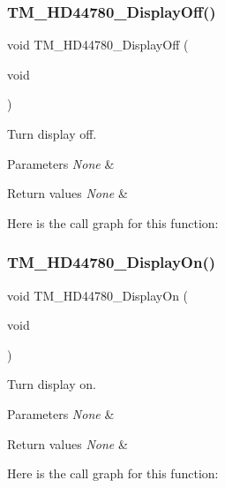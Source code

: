 \subsubsection{\texorpdfstring{T\+M\+\_\+\+H\+D44780\+\_\+\+Display\+Off()}{TM\_HD44780\_DisplayOff()}}
{\footnotesize\ttfamily void T\+M\+\_\+\+H\+D44780\+\_\+\+Display\+Off (\begin{DoxyParamCaption}\item[{void}]{ }\end{DoxyParamCaption})}



Turn display off. 


\begin{DoxyParams}{Parameters}
{\em None} & \\
\hline
\end{DoxyParams}

\begin{DoxyRetVals}{Return values}
{\em None} & \\
\hline
\end{DoxyRetVals}
Here is the call graph for this function\+:
\mbox{\label{group___t_m___h_d44780___functions_ga2f61b153a32e30c63a67888cf8e0ee86}} 
\subsubsection{\texorpdfstring{T\+M\+\_\+\+H\+D44780\+\_\+\+Display\+On()}{TM\_HD44780\_DisplayOn()}}
{\footnotesize\ttfamily void T\+M\+\_\+\+H\+D44780\+\_\+\+Display\+On (\begin{DoxyParamCaption}\item[{void}]{ }\end{DoxyParamCaption})}



Turn display on. 


\begin{DoxyParams}{Parameters}
{\em None} & \\
\hline
\end{DoxyParams}

\begin{DoxyRetVals}{Return values}
{\em None} & \\
\hline
\end{DoxyRetVals}
Here is the call graph for this function\+:
\mbox{\label{group___t_m___h_d44780___functions_ga95ddcfeff8a1e3979f453e3e87164a37}} 
